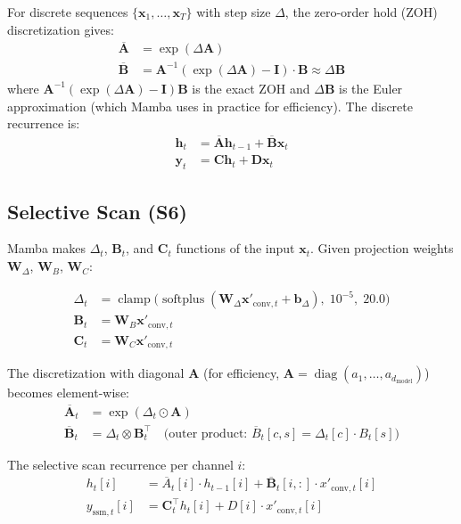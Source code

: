 \documentclass[11pt,a4paper]{article}
\newcommand{\softplus}{\operatorname{softplus}}
\newcommand{\diag}{\operatorname{diag}}
\begin{document}
For discrete sequences $\{\mathbf{x}_1, \ldots, \mathbf{x}_T\}$ with step size
$\Delta$, the zero-order hold (ZOH) discretization gives:
\begin{align}
  \overline{\mathbf{A}} &= \exp(\Delta \mathbf{A}) \\
  \overline{\mathbf{B}} &= \mathbf{A}^{-1}(\exp(\Delta\mathbf{A}) - \mathbf{I}) \cdot \mathbf{B} \approx \Delta \mathbf{B}
\end{align}
where {\footnotesize $\mathbf{A}^{-1}(\exp(\Delta\mathbf{A}) - \mathbf{I})\mathbf{B}$}
is the exact ZOH and $\Delta\mathbf{B}$ is the Euler approximation (which Mamba
uses in practice for efficiency).
The discrete recurrence is:
\begin{align}
  \mathbf{h}_t &= \overline{\mathbf{A}} \mathbf{h}_{t-1} + \overline{\mathbf{B}} \mathbf{x}_t \\
  \mathbf{y}_t &= \mathbf{C} \mathbf{h}_t + \mathbf{D} \mathbf{x}_t
\end{align}

\subsection{Selective Scan (S6)}

Mamba makes $\Delta_t$, $\mathbf{B}_t$, and $\mathbf{C}_t$ functions of the
input $\mathbf{x}_t$. Given projection weights $\mathbf{W}_\Delta$,
$\mathbf{W}_B$, $\mathbf{W}_C$:

\begin{align}
  \Delta_t &= \operatorname{clamp}\bigl(\softplus(\mathbf{W}_\Delta \mathbf{x}'_{\text{conv},t} + \mathbf{b}_\Delta),\; 10^{-5},\; 20.0\bigr) \\
  \mathbf{B}_t &= \mathbf{W}_B \mathbf{x}'_{\text{conv},t} \\
  \mathbf{C}_t &= \mathbf{W}_C \mathbf{x}'_{\text{conv},t}
\end{align}

The discretization with diagonal $\mathbf{A}$ (for efficiency,
$\mathbf{A} = \diag(a_1, \ldots, a_{d_{\text{model}}})$) becomes element-wise:
\begin{align}
  \overline{\mathbf{A}}_t &= \exp\left(\Delta_t \odot \mathbf{A}\right) \\
  \overline{\mathbf{B}}_t &= \Delta_t \otimes \mathbf{B}_t^\top \quad\text{(outer product: $\overline{B}_t[c,s] = \Delta_t[c] \cdot B_t[s]$)} \label{eq:bbar}
\end{align}

The selective scan recurrence per channel $i$:
\begin{align}
  h_t[i] &= \overline{A}_t[i] \cdot h_{t-1}[i] + \overline{\mathbf{B}}_t[i,:] \cdot x'_{\text{conv},t}[i] \\
  y_{\text{ssm},t}[i] &= \mathbf{C}_t^\top h_t[i] + D[i] \cdot x'_{\text{conv},t}[i]
\end{align}
\end{document}
